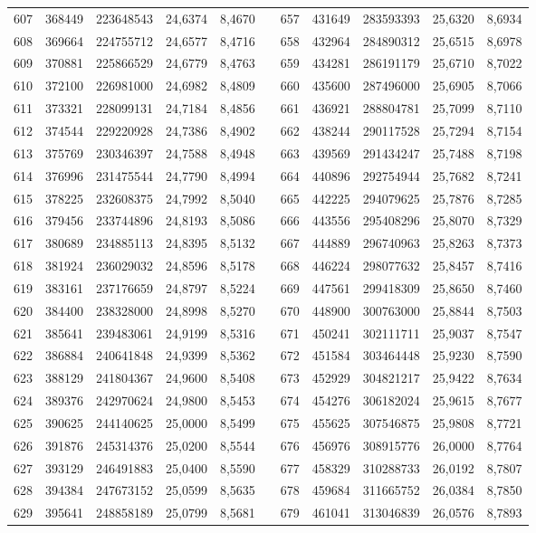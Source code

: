 \begin{longtable}{rrrrrrrrrrr}
607&368449&223648543&24,6374&8,4670&&657&431649&283593393&25,6320&8,6934\\
608&369664&224755712&24,6577&8,4716&&658&432964&284890312&25,6515&8,6978\\
609&370881&225866529&24,6779&8,4763&&659&434281&286191179&25,6710&8,7022\\
610&372100&226981000&24,6982&8,4809&&660&435600&287496000&25,6905&8,7066\\
611&373321&228099131&24,7184&8,4856&&661&436921&288804781&25,7099&8,7110\\
612&374544&229220928&24,7386&8,4902&&662&438244&290117528&25,7294&8,7154\\
613&375769&230346397&24,7588&8,4948&&663&439569&291434247&25,7488&8,7198\\
614&376996&231475544&24,7790&8,4994&&664&440896&292754944&25,7682&8,7241\\
615&378225&232608375&24,7992&8,5040&&665&442225&294079625&25,7876&8,7285\\
616&379456&233744896&24,8193&8,5086&&666&443556&295408296&25,8070&8,7329\\
617&380689&234885113&24,8395&8,5132&&667&444889&296740963&25,8263&8,7373\\
618&381924&236029032&24,8596&8,5178&&668&446224&298077632&25,8457&8,7416\\
619&383161&237176659&24,8797&8,5224&&669&447561&299418309&25,8650&8,7460\\
620&384400&238328000&24,8998&8,5270&&670&448900&300763000&25,8844&8,7503\\
621&385641&239483061&24,9199&8,5316&&671&450241&302111711&25,9037&8,7547\\
622&386884&240641848&24,9399&8,5362&&672&451584&303464448&25,9230&8,7590\\
623&388129&241804367&24,9600&8,5408&&673&452929&304821217&25,9422&8,7634\\
624&389376&242970624&24,9800&8,5453&&674&454276&306182024&25,9615&8,7677\\
625&390625&244140625&25,0000&8,5499&&675&455625&307546875&25,9808&8,7721\\
626&391876&245314376&25,0200&8,5544&&676&456976&308915776&26,0000&8,7764\\
627&393129&246491883&25,0400&8,5590&&677&458329&310288733&26,0192&8,7807\\
628&394384&247673152&25,0599&8,5635&&678&459684&311665752&26,0384&8,7850\\
629&395641&248858189&25,0799&8,5681&&679&461041&313046839&26,0576&8,7893\\

\end{longtable}
